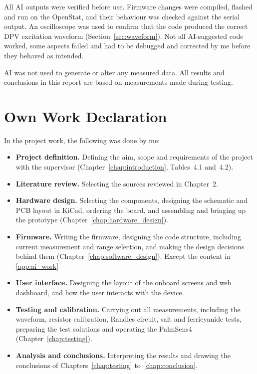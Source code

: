 All AI outputs were verified before use. Firmware changes were compiled,
flashed and run on the OpenStat, and their behaviour was checked against
the serial output. An oscilloscope was used to confirm that the code
produced the correct DPV excitation waveform (Section~\ref{sec:waveform}).
Not all AI-suggested code worked, some aspects failed and had to be debugged and corrected by me before they
behaved as intended.

AI was not used to generate or alter any measured data. All results and
conclusions in this report are based on measurements made during testing.

\section{Own Work Declaration}
\label{app:own_work}

In the project work, the following was done by me:
\begin{itemize}[label=\textbullet]
  \item \textbf{Project definition.} Defining the aim, scope and
    requirements of the project with the supervisor
    (Chapter~\ref{chap:introduction}, Tables~4.1 and~4.2).
  \item \textbf{Literature review.} Selecting the
    sources reviewed in Chapter~2.
  \item \textbf{Hardware design.} Selecting the components, designing the
    schematic and PCB layout in KiCad, ordering the board, and assembling
    and bringing up the prototype (Chapter~\ref{chap:hardware_design}).
  \item \textbf{Firmware.} Writing the firmware, designing the
    code structure, including current measurement and range selection,
    and making the design decisions behind them
    (Chapter~\ref{chap:software_design}). Except the content in \ref{app:ai_work}
  \item \textbf{User interface.} Designing the layout of the onboard
    screens and web dashboard, and how the user interacts with the device.
  \item \textbf{Testing and calibration.} Carrying out all measurements,
    including the waveform, resistor calibration, Randles circuit, salt
    and ferricyanide tests, preparing the test solutions and operating
    the PalmSens4 (Chapter~\ref{chap:testing}).
  \item \textbf{Analysis and conclusions.} Interpreting the results and
    drawing the conclusions of Chapters~\ref{chap:testing}
    to~\ref{chap:conclusion}.
\end{itemize}

